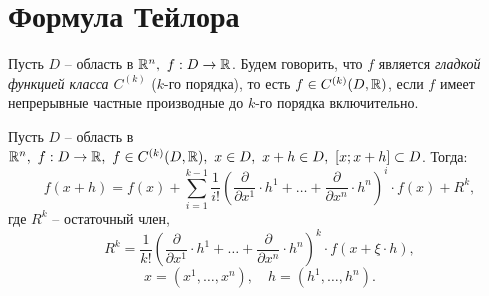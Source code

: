 \section{Формула Тейлора}

\begin{definition}
    Пусть $ D $ -- область в $ \mathbb{R}^n, \ f:D \rightarrow \mathbb{R} $. Будем говорить, что $ f $ является \emph{гладкой функцией класса $ C^{(k)} $} ($ k $-го порядка), то есть $ f\in C^{(k)}(D,\mathbb{R}) $, если $ f $ имеет непрерывные частные производные до $k$-го порядка включительно.
\end{definition}

\begin{theorem}
    Пусть $D$ -- область в $\mathbb{R}^n, \ f:D\rightarrow\mathbb{R}, \ f\in C^{(k)}(D,\mathbb{R}), \ x \in D, \ x + h \in D, \ [x;x+h] \subset D$. Тогда:
    \[
        f(x + h) = f(x) + \sum_{i=1}^{k-1}\frac{1}{i!}\left(\frac{\partial}{\partial x^1}\cdot h^1 + \ldots + \frac{\partial}{\partial x^n}\cdot h^n\right)^i \cdot f(x) + R^k,
    \]
    где $R^k$ -- остаточный член,
    \[
        R^k = \frac{1}{k!}\left(\frac{\partial}{\partial x^1}\cdot h^1 + \ldots + \frac{\partial}{\partial x^n}\cdot h^n\right)^k \cdot f(x + \xi \cdot h),
    \]
    \[
        x = (x^1,\ldots,x^n), \quad h = (h^1,\ldots,h^n).
    \]
\end{theorem}

